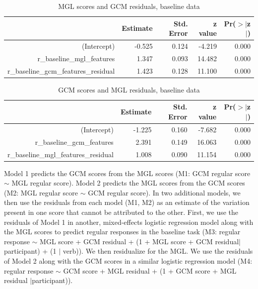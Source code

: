 \documentclass[12pt]{article}
\begin{document}
\begin{table}[ht]
\centering
\begin{tabular}{rrrrr}
  \hline
 & Estimate & Std. Error & z value & Pr($>$$|$z$|$) \\ 
  \hline
(Intercept) & -0.525 & 0.124 & -4.219 & 0.000 \\ 
  r\_baseline\_mgl\_features & 1.347 & 0.093 & 14.482 & 0.000 \\ 
  r\_baseline\_gcm\_features\_residual & 1.423 & 0.128 & 11.100 & 0.000 \\ 
   \hline
\end{tabular}
\caption{MGL scores and GCM residuals, baseline data} 
\label{resid1}
\end{table}
\begin{table}[ht]
\centering
\begin{tabular}{rrrrr}
  \hline
 & Estimate & Std. Error & z value & Pr($>$$|$z$|$) \\ 
  \hline
(Intercept) & -1.225 & 0.160 & -7.682 & 0.000 \\ 
  r\_baseline\_gcm\_features & 2.391 & 0.149 & 16.063 & 0.000 \\ 
  r\_baseline\_mgl\_features\_residual & 1.008 & 0.090 & 11.154 & 0.000 \\ 
   \hline
\end{tabular}
\caption{GCM scores and MGL residuals, baseline data} 
\label{resid2}
\end{table}
Model 1 predicts the GCM scores from the MGL scores (M1: GCM regular score  $\sim$ MGL regular score). Model 2 predicts the MGL scores from the GCM scores (M2: MGL regular score  $\sim$ GCM regular score). In two additional models, we then use the residuals from each model (M1, M2) as an estimate of the variation present in one score that cannot be attributed to the other.  First, we use the residuals of Model 1 in another, mixed-effects logistic regression model along with the MGL scores to predict regular responses in the baseline task (M3: regular response  $\sim$ MGL score + GCM residual + (1 + MGL score + GCM residual$|$participant) + (1 $|$ verb)). We then residualize for the MGL. We use the residuals of Model 2 along with the GCM scores in a similar logistic regression model (M4: regular response  $\sim$ GCM score + MGL residual + (1 + GCM score + MGL residual $|$participant)). 
\end{document}
